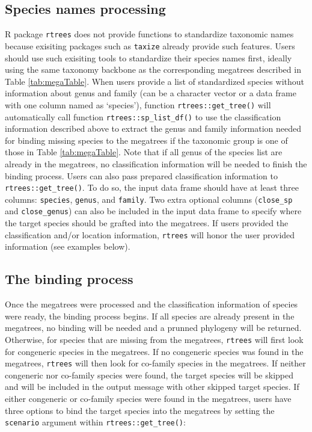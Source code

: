 \documentclass[
  12pt,
]{article}
\begin{document}
\hypertarget{species-names-processing}{%
\subsection{Species names processing}\label{species-names-processing}}

R package \texttt{rtrees} does not provide functions to standardize taxonomic names because exisiting packages such as \texttt{taxize} already provide such features. Users should use such exisiting tools to standardize their species names first, ideally using the same taxonomy backbone as the corresponding megatrees described in Table \ref{tab:megaTable}. When users provide a list of standardized species without information about genus and family (can be a character vector or a data frame with one column named as `species'), function \texttt{rtrees::get\_tree()} will automatically call function \texttt{rtrees::sp\_list\_df()} to use the classification information described above to extract the genus and family information needed for binding missing species to the megatrees if the taxonomic group is one of those in Table \ref{tab:megaTable}. Note that if all genus of the species list are already in the megatrees, no classification information will be needed to finish the binding process. Users can also pass prepared classification information to \texttt{rtrees::get\_tree()}. To do so, the input data frame should have at least three columns: \texttt{species}, \texttt{genus}, and \texttt{family}. Two extra optional columns (\texttt{close\_sp} and \texttt{close\_genus}) can also be included in the input data frame to specify where the target species should be grafted into the megatrees. If users provided the classification and/or location information, \texttt{rtrees} will honor the user provided information (see examples below).

\hypertarget{the-binding-process}{%
\subsection{The binding process}\label{the-binding-process}}

Once the megatrees were processed and the classification information of species were ready, the binding process begins. If all species are already present in the megatrees, no binding will be needed and a prunned phylogeny will be returned. Otherwise, for species that are missing from the megatrees, \texttt{rtrees} will first look for congeneric species in the megatrees. If no congeneric species was found in the megatrees, \texttt{rtrees} will then look for co-family species in the megatrees. If neither congeneric nor co-family species were found, the target species will be skipped and will be included in the output message with other skipped target species. If either congeneric or co-family species were found in the megatrees, users have three options to bind the target species into the megatrees by setting the \texttt{scenario} argument within \texttt{rtrees::get\_tree()}:
\end{document}
